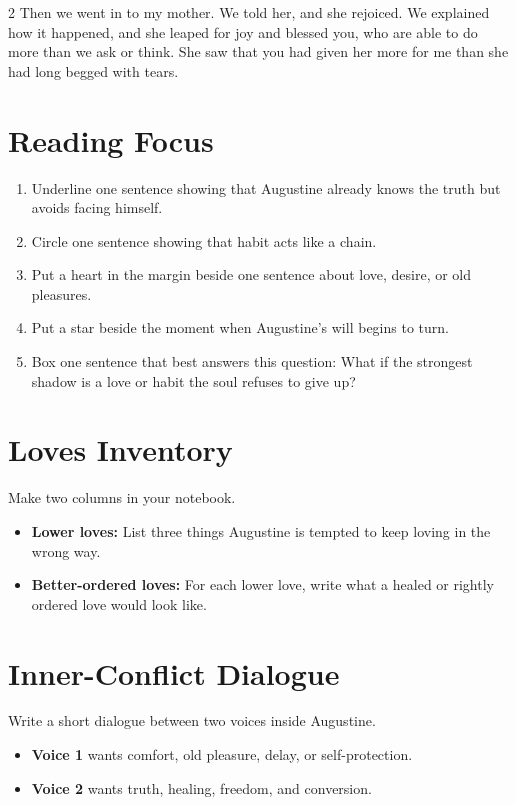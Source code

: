 \documentclass[12pt]{article}
\begin{document}
\begin{multicols}{2}
Then we went in to my mother. We told her, and she rejoiced. We explained how it happened, and she leaped for joy and blessed you, who are able to do more than we ask or think. She saw that you had given her more for me than she had long begged with tears.

\section*{Reading Focus}
\begin{enumerate}[leftmargin=*, itemsep=0.2em]
\item Underline one sentence showing that Augustine already knows the truth but avoids facing himself.
\item Circle one sentence showing that habit acts like a chain.
\item Put a heart in the margin beside one sentence about love, desire, or old pleasures.
\item Put a star beside the moment when Augustine's will begins to turn.
\item Box one sentence that best answers this question: What if the strongest shadow is a love or habit the soul refuses to give up?
\end{enumerate}

\section*{Loves Inventory}
Make two columns in your notebook.

\begin{itemize}[leftmargin=*, itemsep=0.2em]
\item \textbf{Lower loves:} List three things Augustine is tempted to keep loving in the wrong way.
\item \textbf{Better-ordered loves:} For each lower love, write what a healed or rightly ordered love would look like.
\end{itemize}

\section*{Inner-Conflict Dialogue}
Write a short dialogue between two voices inside Augustine.

\begin{itemize}[leftmargin=*, itemsep=0.2em]
\item \textbf{Voice 1} wants comfort, old pleasure, delay, or self-protection.
\item \textbf{Voice 2} wants truth, healing, freedom, and conversion.
\end{itemize}


\end{multicols}
\end{document}
